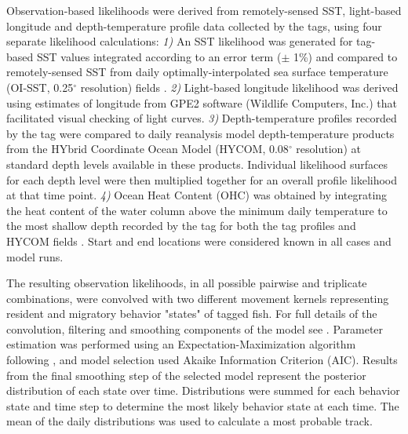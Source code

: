 Observation-based likelihoods were derived from remotely-sensed SST, light-based longitude and depth-temperature profile data collected by the tags, using four separate likelihood calculations: \emph{1)} An SST likelihood was generated for tag-based SST values integrated according to an error term (\(\pm\) 1\%) and compared to remotely-sensed SST from daily optimally-interpolated sea surface temperature (OI-SST, 0.25$^{\circ}$ resolution) fields \citep{Reynolds2007, Banzon2016}. \emph{2)} Light-based longitude likelihood was derived using estimates of longitude from GPE2 software (Wildlife Computers, Inc.) that facilitated visual checking of light curves. \emph{3)} Depth-temperature profiles recorded by the tag were compared to daily reanalysis model depth-temperature products from the HYbrid Coordinate Ocean Model (HYCOM, 0.08$^{\circ}$ resolution)\citep{Bleck2002, Chassignet2007} at standard depth levels available in these products. Individual likelihood surfaces for each depth level were then multiplied together for an overall profile likelihood at that time point. \emph{4)} Ocean Heat Content (OHC) was obtained by integrating the heat content of the water column above the minimum daily temperature to the most shallow depth recorded by the tag for both the tag profiles and HYCOM fields \citep{Luo2015, Braun2018b}. Start and end locations were considered known in all cases and model runs.

The resulting observation likelihoods, in all possible pairwise and triplicate combinations, were convolved with two different movement kernels representing resident and migratory behavior "states" of tagged fish. For full details of the convolution, filtering and smoothing components of the model see \citet{Braun2018a}. Parameter estimation was performed using an Expectation-Maximization algorithm following \citet{Woillez2016}, and model selection used Akaike Information Criterion (AIC). Results from the final smoothing step of the selected model represent the posterior distribution of each state over time. Distributions were summed for each behavior state and time step to determine the most likely behavior state at each time. The mean of the daily distributions was used to calculate a most probable track.

